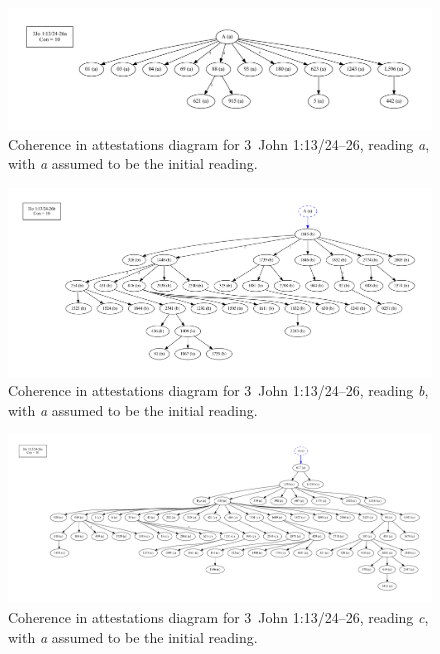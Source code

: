 \documentclass[a4paper, 12pt]{article}
\begin{document}
	\begin{figure}
		\centering
		\includegraphics[scale=0.3333]{../graphics/B25K1V13U24-26Ra-coherence-attestations-1.pdf}
		\caption{Coherence in attestations diagram for 3~John 1:13/24–26, reading \emph{a}, with \emph{a} assumed to be the initial reading.}
		\label{fig:coherence-a-1}
	\end{figure}
	
	\begin{figure}
		\centering
		\includegraphics[scale=0.3333]{../graphics/B25K1V13U24-26Rb-coherence-attestations-1.pdf}
		\caption{Coherence in attestations diagram for 3~John 1:13/24–26, reading \emph{b}, with \emph{a} assumed to be the initial reading.}
		\label{fig:coherence-b-1}
	\end{figure}
	
	\begin{figure}
		\centering
		\includegraphics[scale=0.3333]{../graphics/B25K1V13U24-26Rc-coherence-attestations-1.pdf}
		\caption{Coherence in attestations diagram for 3~John 1:13/24–26, reading \emph{c}, with \emph{a} assumed to be the initial reading.}
		\label{fig:coherence-c-1}
	\end{figure}
	
\end{document}
